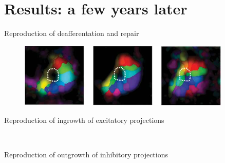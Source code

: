 \section{Results: a few years later}
\begin{frame}[c]{Reproduction of deafferentation and repair}
  \begin{figure}
      \centering
      \includegraphics[width=0.9\textwidth]{99_images/keck-1-2c}\\%
      \quad{}\resizebox{0.9\textwidth}{!}{}%
  \end{figure}
\end{frame}
\begin{frame}[c]{Reproduction of ingrowth of excitatory projections}
  \begin{figure}
      \centering
      \resizebox{0.9\textwidth}{!}{}\\\vspace{0.2cm}%
      \resizebox{0.8\textwidth}{!}{}%
  \end{figure}
\end{frame}
\begin{frame}[c]{Reproduction of outgrowth of inhibitory projections}
  \begin{figure}
      \centering
      \resizebox{0.9\textwidth}{!}{}\\\vspace{0.2cm}%
      \resizebox{0.8\textwidth}{!}{}%
  \end{figure}
\end{frame}
